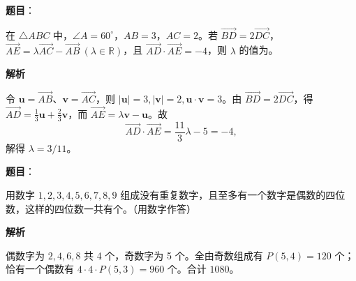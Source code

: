\begin{answer}

\textbf{题目}：

在 $\triangle ABC$ 中，$\angle A=60^\circ$，$AB=3$，$AC=2$。若 $\overrightarrow{BD}=2\overrightarrow{DC}$，$\overrightarrow{AE}=\lambda\overrightarrow{AC}-\overrightarrow{AB}\ (\lambda\in\mathbb R)$，且 $\overrightarrow{AD}\cdot\overrightarrow{AE}=-4$，则 $\lambda$ 的值为\gkblank{}。

\textbf{解析}

令 $\mathbf u=\overrightarrow{AB}$、$\mathbf v=\overrightarrow{AC}$，则 $|\mathbf u|=3,|\mathbf v|=2,\mathbf u\cdot\mathbf v=3$。由 $\overrightarrow{BD}=2\overrightarrow{DC}$，得 $\overrightarrow{AD}=\frac13\mathbf u+\frac23\mathbf v$，而 $\overrightarrow{AE}=\lambda\mathbf v-\mathbf u$。故
\nopagebreak[4]
\[
\overrightarrow{AD}\cdot\overrightarrow{AE}
=\frac{11}{3}\lambda-5=-4,
\]
解得 $\lambda=3/11$。


\end{answer}
\begin{answer}

\textbf{题目}：

用数字 $1,2,3,4,5,6,7,8,9$ 组成没有重复数字，且至多有一个数字是偶数的四位数，这样的四位数一共有\gkblank{}个。（用数字作答）

\textbf{解析}

偶数字为 $2,4,6,8$ 共 4 个，奇数字为 5 个。全由奇数组成有 $P(5,4)=120$ 个；恰有一个偶数有 $4\cdot4\cdot P(5,3)=960$ 个。合计 $1080$。


\end{answer}

